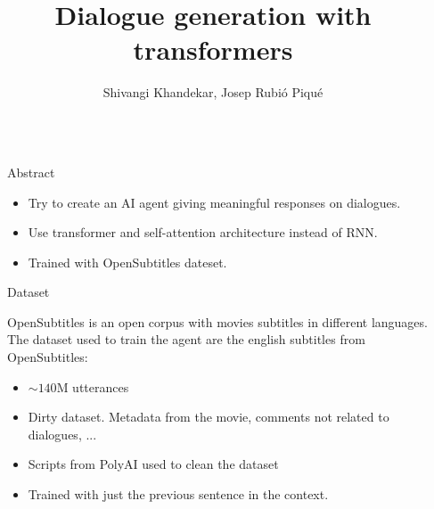 \documentclass[final]{beamer}
\title{Dialogue generation with transformers} %
\author{{\huge Shivangi Khandekar, Josep Rubió Piqué}} %
\institute{{\huge UAB, Natural Language Processing}} %
\newlength{\sepwid}
\newlength{\onecolwid}
\begin{document}

\setlength{\belowcaptionskip}{2ex} %
\setlength\belowdisplayshortskip{2ex} %

\begin{frame}[t] %

\begin{columns}[t] %

\begin{column}{\sepwid}\end{column} %

\begin{column}{\onecolwid} %


\begin{alertblock}{Abstract}
	\begin{itemize}
	\item Try to create an AI agent giving meaningful responses on dialogues.
    \item Use transformer and self-attention architecture instead of RNN.
    \item Trained with OpenSubtitles dateset.
	\end{itemize}
\end{alertblock}

\begin{block}{Dataset}

OpenSubtitles is an open corpus with movies subtitles in different languages.\\
\vspace{10mm}
The dataset used to train the agent are the english subtitles from OpenSubtitles:
	\begin{itemize} 
	\item $\sim140$M utterances
	\item Dirty dataset. Metadata from the movie, comments not related to dialogues, ...
    \item Scripts from PolyAI used to clean the dataset
    \item Trained with just the previous sentence in the context.
	\end{itemize}\\[1\baselineskip]
	

\end{block}
\end{column}
\end{columns}
\end{frame}
\end{document}
